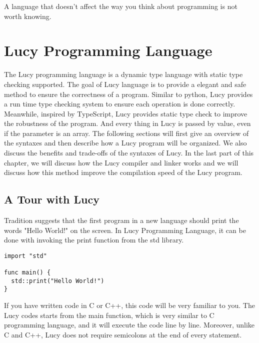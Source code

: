 \begin{savequote}[75mm]
A language that doesn't affect the way you think about programming is not worth knowing.
\end{savequote}

\chapter{Lucy Programming Language}
The Lucy programming language is a dynamic type language with static type checking supported. The goal of Lucy language is to provide a elegant and safe method to ensure the correctness of a program. Similar to python, Lucy provides a run time type checking system to ensure each operation is done correctly. Meanwhile, inspired by TypeScript, Lucy provides static type check to improve the robustness of the program. And every thing in Lucy is passed by value, even if the parameter is an array.
The following sections will first give an overview of the syntaxes and then describe how a Lucy program will be organized. We also discuss the benefits and trade-offs of the syntaxes of Lucy. In the last part of this chapter, we will discuss how the Lucy compiler and linker works and we will discuss how this method improve the compilation speed of the Lucy program.


\section{A Tour with Lucy}
Tradition suggests that the first program in a new language should print the words "Hello World!" on the screen. In Lucy Programming Language, it can be done with invoking the print function from the std library.
\begin{lstlisting}
import "std"

func main() {
  std::print("Hello World!")
}
\end{lstlisting}
If you have written code in C or C++, this code will be very familiar to you. The Lucy codes starts from the main function, which is very similar to C programming language, and it will execute the code line by line. Moreover, unlike C and C++, Lucy does not require semicolons at the end of every statement.

